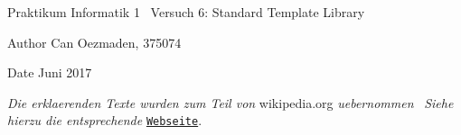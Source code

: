 Praktikum Informatik 1~\newline
Versuch 6\+: Standard Template Library

\begin{DoxyAuthor}{Author}
Can Oezmaden, 375074 
\end{DoxyAuthor}
\begin{DoxyDate}{Date}
Juni 2017
\end{DoxyDate}
{\itshape Die erklaerenden Texte wurden zum Teil von} wikipedia.\+org {\itshape uebernommen}~\newline
{\itshape Siehe hierzu die entsprechende} \href{https://en.wikipedia.org/wiki/Stack_(abstract_data_type)}{\tt Webseite}. 